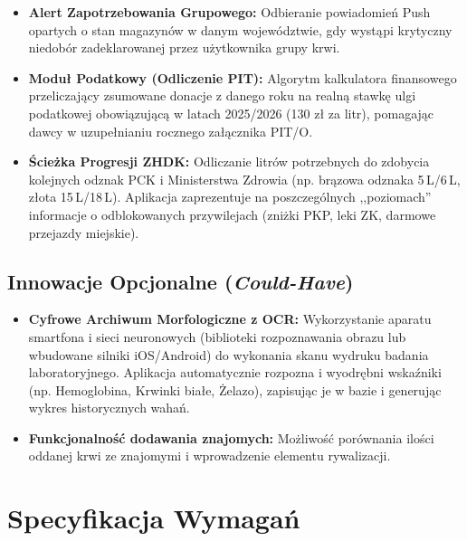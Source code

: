 \documentclass[11pt, a4paper]{article}
\begin{document}
\begin{itemize}
  \item \textbf{Alert Zapotrzebowania Grupowego:} Odbieranie powiadomień Push opartych
        o stan magazynów w danym województwie, gdy wystąpi krytyczny niedobór
        zadeklarowanej przez użytkownika grupy krwi.

  \item \textbf{Moduł Podatkowy (Odliczenie PIT):} Algorytm kalkulatora finansowego
        przeliczający zsumowane donacje z danego roku na realną stawkę ulgi podatkowej
        obowiązującą w latach 2025/2026 (130 zł za litr), pomagając dawcy w
        uzupełnianiu rocznego załącznika PIT/O.

  \item \textbf{Ścieżka Progresji ZHDK:} Odliczanie litrów potrzebnych do zdobycia
        kolejnych odznak PCK i Ministerstwa Zdrowia (np. brązowa odznaka 5\,L/6\,L,
        złota 15\,L/18\,L). Aplikacja zaprezentuje na poszczególnych ,,poziomach''
        informacje o odblokowanych przywilejach (zniżki PKP, leki ZK, darmowe
        przejazdy miejskie).
\end{itemize}

\subsection{Innowacje Opcjonalne (\textit{Could-Have})}

\begin{itemize}
  \item \textbf{Cyfrowe Archiwum Morfologiczne z OCR:} Wykorzystanie aparatu smartfona
        i sieci neuronowych (biblioteki rozpoznawania obrazu lub wbudowane silniki
        iOS/Android) do wykonania skanu wydruku badania laboratoryjnego. Aplikacja
        automatycznie rozpozna i wyodrębni wskaźniki (np. Hemoglobina, Krwinki białe,
        Żelazo), zapisując je w bazie i generując wykres historycznych wahań.

  \item \textbf{Funkcjonalność dodawania znajomych:} Możliwość porównania ilości
        oddanej krwi ze znajomymi i wprowadzenie elementu rywalizacji.
\end{itemize}

\section{Specyfikacja Wymagań}
\end{document}
